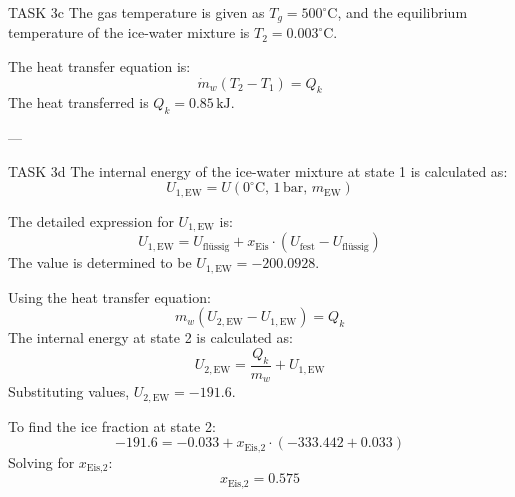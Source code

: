 TASK 3c  
The gas temperature is given as \( T_g = 500^\circ\text{C} \), and the equilibrium temperature of the ice-water mixture is \( T_{2} = 0.003^\circ\text{C} \).  

The heat transfer equation is:  
\[
\dot{m}_w (T_2 - T_1) = Q_k
\]  
The heat transferred is \( Q_k = 0.85 \, \text{kJ} \).  

---

TASK 3d  
The internal energy of the ice-water mixture at state 1 is calculated as:  
\[
U_{1,\text{EW}} = U(0^\circ\text{C}, \, 1 \, \text{bar}, \, m_{\text{EW}})
\]  

The detailed expression for \( U_{1,\text{EW}} \) is:  
\[
U_{1,\text{EW}} = U_{\text{flüssig}} + x_{\text{Eis}} \cdot (U_{\text{fest}} - U_{\text{flüssig}})
\]  
The value is determined to be \( U_{1,\text{EW}} = -200.0928 \).  

Using the heat transfer equation:  
\[
m_w (U_{2,\text{EW}} - U_{1,\text{EW}}) = Q_k
\]  
The internal energy at state 2 is calculated as:  
\[
U_{2,\text{EW}} = \frac{Q_k}{m_w} + U_{1,\text{EW}}
\]  
Substituting values, \( U_{2,\text{EW}} = -191.6 \).  

To find the ice fraction at state 2:  
\[
-191.6 = -0.033 + x_{\text{Eis,2}} \cdot (-333.442 + 0.033)
\]  
Solving for \( x_{\text{Eis,2}} \):  
\[
x_{\text{Eis,2}} = 0.575
\]  

